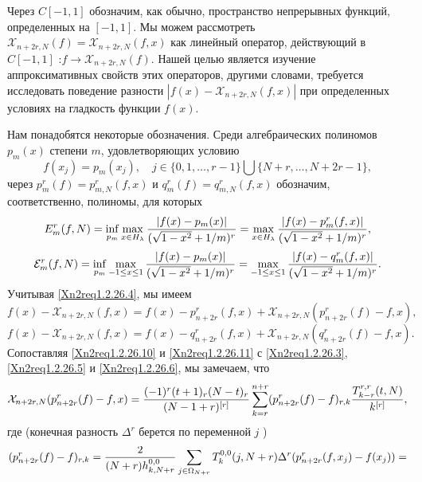 Через $C[-1,1]$ обозначим, как обычно, пространство непрерывных
функций, определенных на $[-1,1]$. Мы можем рассмотреть  $\mathcal{X}_{n+2r,N}(f)=\mathcal{X}_{n+2r,N}(f,x)$ как линейный оператор,
действующий в $C[-1,1]$ :$f\to \mathcal{X}_{n+2r,N}(f)$. Нашей целью
является изучение аппроксимативных свойств этих операторов, другими
словами, требуется исследовать поведение разности $|f(x)-\mathcal{X}_{n+2r,N}(f,x)|$ при определенных условиях на гладкость функции
$f(x)$.

Нам понадобятся некоторые обозначения. Среди алгебраических
полиномов $p_m(x)$ степени $m$, удовлетворяющих условию
\begin{equation}\label{Xn2req1.2.26.7}
f(x_j)=p_m(x_j),\quad j\in
\{0,1,\ldots,r-1\}\bigcup\{N+r,\ldots,N+2r-1\},
\end{equation}
 через $p_m^r(f)=p_{m,N}^r(f,x)$ и $q_m^r(f)=q_{m,N}^r(f,x)$ обозначим,
соответственно, полиномы,  для которых
\begin{equation}\label{Xn2req1.2.26.8}
E_m^r(f,N)=\inf_{p_m}\max_{x\in H_\lambda}{|f(x)-p_m(x)|\over(\sqrt{1-x^2}+1/m)^r}=\max_{x\in
H_\lambda}{|f(x)-p_m^r(f,x)|\over(\sqrt{1-x^2}+1/m)^r},
\end{equation}
\begin{equation}\label{Xn2req1.2.26.9}
\mathcal{E}_m^r(f,N)=\inf_{p_m}\max_{-1\le
x\le1}{|f(x)-p_m(x)|\over(\sqrt{1-x^2}+1/m)^r}=\max_{-1\le
x\le1}{|f(x)-q_m^r(f,x)|\over(\sqrt{1-x^2}+1/m)^r}.
\end{equation}
Учитывая \eqref{Xn2req1.2.26.4}, мы имеем
\begin{equation}
\label{Xn2req1.2.26.10}
f(x)-\mathcal{X}_{n+2r,N}(f,x)=f(x)-p_{n+2r}^r(f,x)+\mathcal{X}_{n+2r,N}(p_{n+2r}^r(f)-f,x),
\end{equation}
\begin{equation}
\label{Xn2req1.2.26.11}
 f(x)-\mathcal{X}_{n+2r,N}(f,x)=f(x)-q_{n+2r}^r(f,x)+\mathcal{X}_{n+2r,N}(q_{n+2r}^r(f)-f,x).
\end{equation}
 Сопоставляя \eqref{Xn2req1.2.26.10} и \eqref{Xn2req1.2.26.11} с \eqref{Xn2req1.2.26.3}, \eqref{Xn2req1.2.26.5}  и \eqref{Xn2req1.2.26.6}, мы замечаем, что
 \begin{equation}\label{Xn2req1.2.26.12}
\mathcal{X}_{n+2r,N}(p_{n+2r}^r(f)-f,x)={(-1)^r (t+1)_r(N-t)_r\over
(N-1+r)^{[r]}} \sum_{k=r}^{n+r} (p_{n+2r}^r(f)-f)_{r,k}
{T_{k-r}^{r,r}(t,N)\over k^{[r]}},
\end{equation}
 где (конечная разность $\Delta^r$ берется по переменной $j$ )
$$(p_{n+2r}^r(f)-f)_{r,k}= {2\over (N+r)h_{k,N+r}^{0,0}}
\sum_{j\in\Omega_{N+r}}T_k^{0,0}(j,N+r)\Delta^r(p_{n+2r}^r(f,x_j)-f(x_j))=
$$
